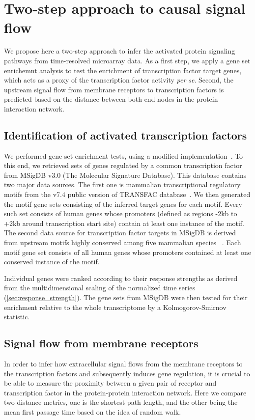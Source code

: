\section{Two-step approach to causal signal flow}
We propose here a two-step approach to infer the activated protein signaling
pathways from time-resolved microarray data. As a first step, we apply a
gene set enrichemnt analysis to test the
enrichment of transcription factor target genes, which acts as a proxy of
the transcription factor activity \emph{per se}. Second, the upstream 
signal flow from membrane receptors to transcription factors is predicted 
based on the distance between both end nodes in the protein interaction
network.

\subsection{Identification of activated transcription factors}
We performed gene set enrichment tests, 
using a modified implementation~\citep{Luo2009}.
To this end, we retrieved sets of genes regulated by 
a common transcription factor from MSigDB v3.0 (The Molecular Signature Database). 
This database contains two major data sources. The first one is mammalian 
transcriptional regulatory motifs from the v7.4 public version of TRANSFAC 
database~\citep{Matys2003b}. We then generated the motif gene sets consisting 
of the inferred target genes for each motif. Every such set consists of human 
genes whose promoters (defined as regions -2kb to +2kb around transcription 
start site) contain at least one instance of the motif.
The second data source for transcription factor targets in MSigDB is derived 
from upstream motifs highly conserved among five mammalian species~%
\citep{Xie2005e}. Each motif gene set consists of all human genes whose 
promoters contained at least one conserved instance of the motif.

Individual genes were  ranked according to their response strengths as derived from the 
multidimensional scaling of the normalized time series 
(\ref{sec:response_strength}). 
The gene sets from MSigDB were  then tested for their enrichment 
 relative to the whole transcriptome by a Kolmogorov-Smirnov statistic. 

\subsection{Signal flow from membrane receptors}
In order to infer how extracellular signal flows from the membrane receptors to 
the transcription factors and subsequently induces gene regulation, it is 
crucial to be able to measure the proximity between a given pair of receptor and
transcription factor in the protein-protein interaction network. Here we 
compare two distance metrics, one is the shortest path length, and the other
being the mean first passage time based on the idea of random walk.

